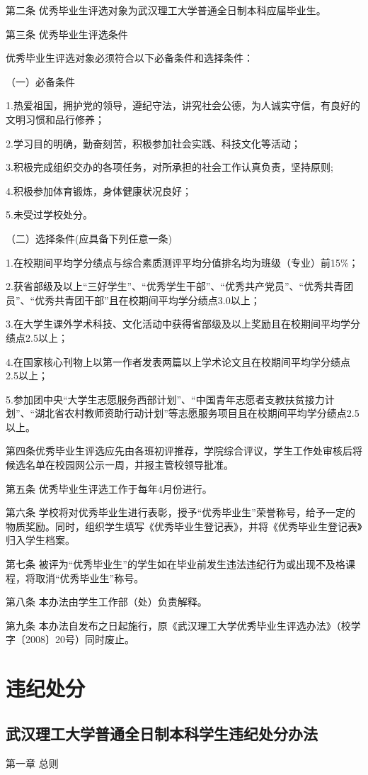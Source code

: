 \documentclass[UTF8,12pt,a4paper]{report}
\begin{document}
第二条 优秀毕业生评选对象为武汉理工大学普通全日制本科应届毕业生。

第三条 优秀毕业生评选条件

优秀毕业生评选对象必须符合以下必备条件和选择条件：

（一）必备条件

1.热爱祖国，拥护党的领导，遵纪守法，讲究社会公德，为人诚实守信，有良好的文明习惯和品行修养；

2.学习目的明确，勤奋刻苦，积极参加社会实践、科技文化等活动；

3.积极完成组织交办的各项任务，对所承担的社会工作认真负责，坚持原则;

4.积极参加体育锻炼，身体健康状况良好；

5.未受过学校处分。

（二）选择条件(应具备下列任意一条)

1.在校期间平均学分绩点与综合素质测评平均分值排名均为班级（专业）前15\%；

2.获省部级及以上“三好学生”、“优秀学生干部”、“优秀共产党员”、“优秀共青团员”、“优秀共青团干部”且在校期间平均学分绩点3.0以上；

3.在大学生课外学术科技、文化活动中获得省部级及以上奖励且在校期间平均学分绩点2.5以上；

4.在国家核心刊物上以第一作者发表两篇以上学术论文且在校期间平均学分绩点2.5以上；

5.参加团中央“大学生志愿服务西部计划”、“中国青年志愿者支教扶贫接力计划”、“湖北省农村教师资助行动计划”等志愿服务项目且在校期间平均学分绩点2.5以上。

第四条优秀毕业生评选应先由各班初评推荐，学院综合评议，学生工作处审核后将候选名单在校园网公示一周，并报主管校领导批准。

第五条 优秀毕业生评选工作于每年4月份进行。

第六条 学校将对优秀毕业生进行表彰，授予“优秀毕业生”荣誉称号，给予一定的物质奖励。同时，组织学生填写《优秀毕业生登记表》，并将《优秀毕业生登记表》归入学生档案。

第七条 被评为“优秀毕业生”的学生如在毕业前发生违法违纪行为或出现不及格课程，将取消“优秀毕业生”称号。

第八条 本办法由学生工作部（处）负责解释。

第九条 本办法自发布之日起施行，原《武汉理工大学优秀毕业生评选办法》（校学字〔2008〕20号）同时废止。

\part{违纪处分}
\chapter{武汉理工大学普通全日制本科学生违纪处分办法}
第一章  总则
\end{document}
